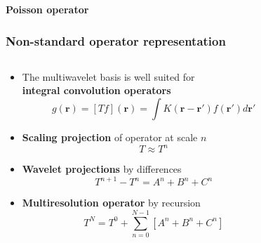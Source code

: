 \begin{frame}
    \centering
    \textbf{\Large{Poisson operator}}
\end{frame}

\begin{frame}
    \frametitle{Non-standard operator representation}
    \scriptsize
    \begin{columns}
    \begin{column}[b]{0.6\linewidth}
    \begin{itemize}
	\item	The multiwavelet basis is well suited for\\ 
        \textbf{integral convolution operators}
	    \begin{equation}
		\nonumber
		g(\boldsymbol{r}) = \left[T f\right](\boldsymbol{r}) = 
		    \int K(\boldsymbol{r} - \boldsymbol{r'})f(\boldsymbol{r'}) d\boldsymbol{r'}
	    \end{equation}
        \pause
	\item \textbf{Scaling projection} of operator at scale $n$
	    \begin{equation}
		\nonumber
		T \approx T^n
	    \end{equation}
        \pause
	\item \textbf{Wavelet projections} by differences
	    \begin{equation}
		\nonumber
		T^{n+1} - T^n = A^n + B^n + C^n
	    \end{equation}
        \pause\pause\pause\pause
	\item \textbf{Multiresolution operator} by recursion
	    \begin{equation}
		\nonumber
		T^N = T^0 + \sum_{n=0}^{N-1} \left[A^n + B^n + C^n\right]
	    \end{equation}
    \end{itemize}
    \end{column}
    \begin{column}[b]{0.4\linewidth}
    \begin{center}
\end{center}
\end{column}
\end{columns}
\end{frame}

